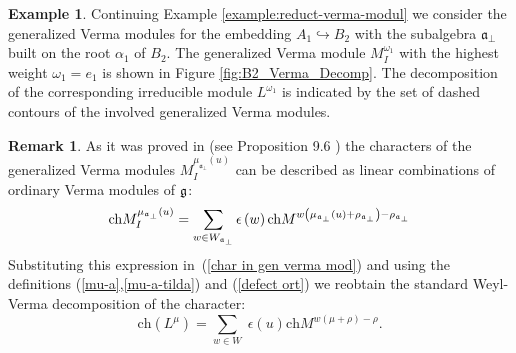 \documentclass[12pt]{article}
\theoremstyle{definition}
\newtheorem{remark}{Remark}
\newtheorem{example}{Example}
\newcommand{\afb}{\mathfrak{a}_{\bot}}
\begin{document}
\begin{example}
  Continuing Example \ref{example:reduct-verma-modul} we consider the generalized Verma modules for the
  embedding  $A_{1}\hookrightarrow B_{2}$ with the subalgebra $\afb$ built on the root $\alpha_{1}$
  of $B_{2}$. The generalized Verma module $M^{\omega_{1}}_{I}$ with the highest weight
  $\omega_{1}=e_{1}$ is shown in Figure \ref{fig:B2_Verma_Decomp}. The decomposition of the corresponding irreducible module
  $L^{\omega_{1}}$ is indicated by the set of dashed contours of the involved generalized Verma
  modules. 

\end{example}

\begin{remark}
As it was proved in \cite{humphreys2008representations} (see Proposition 9.6 ) the characters of the
generalized Verma modules $M_{I}^{\mu _{\afb}\left( u\right) }$
can be described as linear combinations of ordinary Verma modules of $\frak{g%
}$:
\begin{equation*}
\mathrm{ch}M_{I}^{\mu _{\afb}\left( u\right) }=\sum_{w\in W_{%
\afb}}\epsilon \left( w\right) \mathrm{ch}M^{w\left( \mu _{%
\afb}\left( u\right) +\rho _{\afb}\right) -\rho _{%
\afb}}
\end{equation*}
Substituting this expression in\ (\ref{char in gen verma mod}) and using the
definitions (\ref{mu-a},\ref{mu-a-tilda}) and (\ref{defect ort}) we reobtain
the standard Weyl-Verma decomposition of the character:
\begin{equation*}
\mathrm{ch}\left( L^{\mu }\right) =\sum_{w\in W}\;\epsilon (u)\mathrm{ch}%
M^{w\left( \mu +\rho \right) -\rho }.
\end{equation*}
\end{remark}

\end{document}
